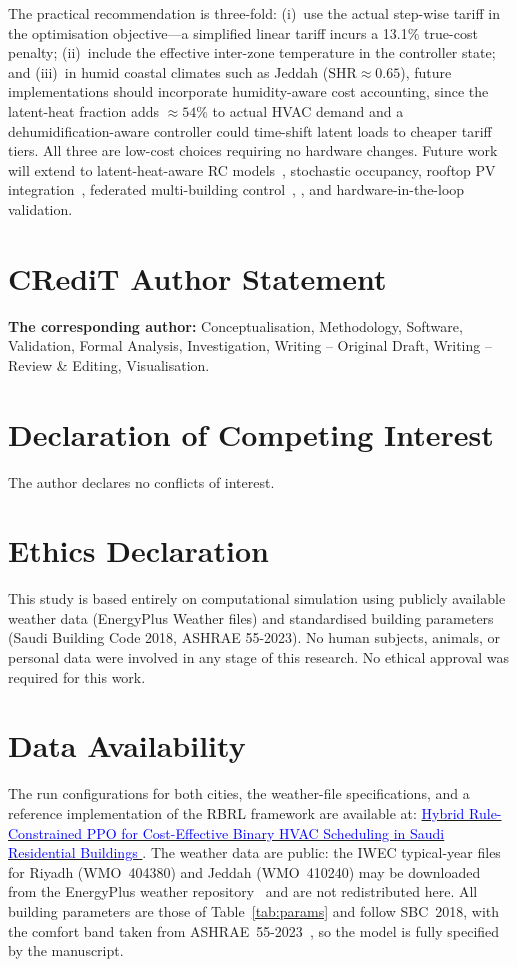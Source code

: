 \documentclass[3p,number]{elsarticle}
\let\oldsection\section
\renewcommand{\section}{\FloatBarrier\oldsection}
\begin{document}
The practical recommendation is three-fold: (i)~use the actual step-wise tariff in the optimisation objective---a simplified linear tariff incurs a 13.1\% true-cost penalty; (ii)~include the effective inter-zone temperature in the controller state; and (iii)~in humid coastal climates such as Jeddah ($\mathrm{SHR}{\approx}0.65$), future implementations should incorporate humidity-aware cost accounting, since the latent-heat fraction adds ${\approx}54\%$ to actual HVAC demand and a dehumidification-aware controller could time-shift latent loads to cheaper tariff tiers.
All three are low-cost choices requiring no hardware changes.
Future work will extend to latent-heat-aware RC models~\cite{Rodrigues2025}, stochastic occupancy, rooftop PV integration~\cite{Alotaibi2024}, federated multi-building control~\cite{Xue2025}, \cite{Yu2021}, and hardware-in-the-loop validation.

\section {CRediT Author Statement}
\textbf{The corresponding author:} Conceptualisation, Methodology, Software,
Validation, Formal Analysis, Investigation, Writing -- Original Draft, Writing
-- Review \& Editing, Visualisation.

\section {Declaration of Competing Interest}
The author declares no conflicts of interest.

\section {Ethics Declaration}
This study is based entirely on computational simulation using publicly available weather data (EnergyPlus Weather files) and standardised building parameters (Saudi Building Code 2018, ASHRAE 55-2023).
No human subjects, animals, or personal data were involved in any stage of this research.
No ethical approval was required for this work.
\section {Data Availability}
The run configurations for both cities, the weather-file specifications, and a reference implementation of the RBRL framework are available at:  \href{https://github.com/drhamzahfaraj/hvac-scheduling-saudi-arabia}{\textcolor{blue}{Hybrid Rule-Constrained PPO for Cost-Effective Binary HVAC Scheduling in Saudi Residential Buildings }}.
The weather data are public: the IWEC typical-year files for Riyadh (WMO~404380) and Jeddah (WMO~410240) may be downloaded from the EnergyPlus weather repository~\cite{EPW2023} and are not redistributed here.
All building parameters are those of Table~\ref{tab:params} and follow SBC~2018, with the comfort band taken from ASHRAE~55-2023~\cite{ASHRAE55_2023}, so the model is fully specified by the manuscript.



\end{document}
